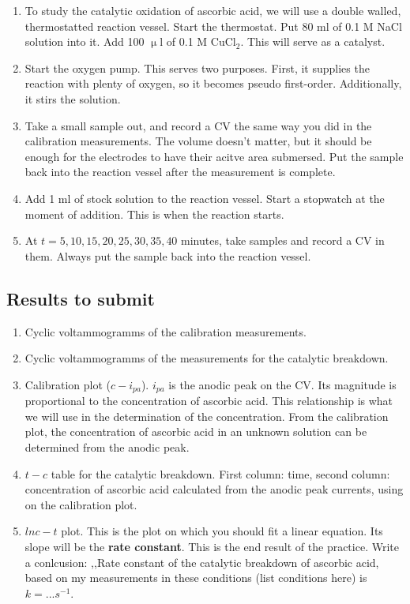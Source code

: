 \begin{enumerate}
\item To study the catalytic oxidation of ascorbic acid, we will use a double walled, thermostatted reaction vessel. Start the thermostat. Put 80 ml of 0.1 M NaCl solution into it. Add 100 $\upmu$l of 0.1 M CuCl$_2$. This will serve as a catalyst.
\item Start the oxygen pump. This serves two purposes. First, it supplies the reaction with plenty of oxygen, so it becomes pseudo first-order. Additionally, it stirs the solution.
\item Take a small sample out, and record a CV the same way you did in the calibration measurements. The volume doesn't matter, but it should be enough for the electrodes to have their acitve area submersed. Put the sample back into the reaction vessel after the measurement is complete.
\item Add 1 ml of stock solution to the reaction vessel. Start a stopwatch at the moment of addition. This is when the reaction starts.
\item At $t = 5, 10, 15, 20, 25, 30, 35, 40$ minutes, take samples and record a CV in them. Always put the sample back into the reaction vessel.
\end{enumerate}

\subsection{Results to submit}

\begin{enumerate}
\item Cyclic voltammogramms of the calibration measurements.
\item Cyclic voltammogramms of the measurements for the catalytic breakdown.
\item Calibration plot ($c - i_{pa}$). $i_{pa}$ is the anodic peak on the CV. Its magnitude is proportional to the concentration of ascorbic acid. This relationship is what we will use in the determination of the concentration. From the calibration plot, the concentration of ascorbic acid in an unknown solution can be determined from the anodic peak.
\item $t - c$ table for the catalytic breakdown. First column: time, second column: concentration of ascorbic acid calculated from the anodic peak currents, using on the calibration plot.
\item $lnc - t$ plot. This is the plot on which you should fit a linear equation. Its slope will be the \textbf{rate constant}. This is the end result of the practice. Write a conlcusion: ,,Rate constant of the catalytic breakdown of ascorbic acid, based on my measurements in these conditions (list conditions here) is $k = ... s^{-1}$.
\end{enumerate}
